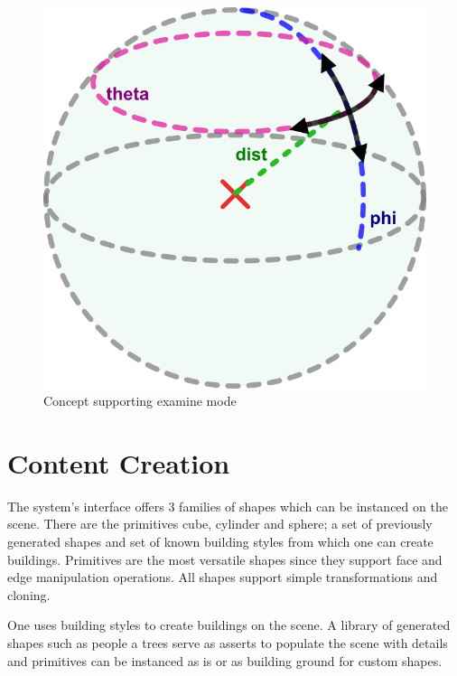 \begin{figure}[ht]
	\centering
		\includegraphics[scale=0.6]{gfx/virtual-sphere.png}
	\caption{Concept supporting examine mode}
	\label{fig:shape}
\end{figure}


\section{Content Creation}

The system's interface offers 3 families of shapes which can be instanced on the scene.
There are the primitives cube, cylinder and sphere; a set of previously generated shapes
and set of known building styles from which one can create buildings.
Primitives are the most versatile shapes since they support face and edge manipulation operations.
All shapes support simple transformations and cloning.

One uses building styles to create buildings on the scene. A library of generated shapes such as
people a trees serve as asserts to populate the scene with details and primitives can be instanced
as is or as building ground for custom shapes.


